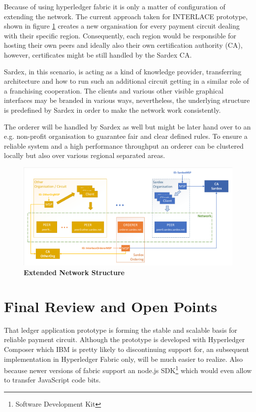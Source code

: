 Because of using hyperledger fabric it is only a matter of configuration of extending the network. The current approach taken for INTERLACE prototype, shown in figure \ref{fig:prototype-net-ext} creates a new organisation for every payment circuit dealing with their specific region. Consequently, each region would be responsible for hosting their own peers and ideally also their own certification authority (CA), however, certificates might be still handled by the Sardex CA. 

Sardex, in this scenario, is acting as a kind of knowledge provider, transferring architecture and how to run such an additional circuit getting in a similar role of a franchising cooperation. The clients and various other visible graphical interfaces may be branded in various ways, nevertheless, the underlying structure is predefined by Sardex in order to make the network work consistently.

The orderer will be handled by Sardex as well but might be later hand over to an e.g. non-profit organisation to guarantee fair and clear defined rules. To ensure a reliable system and a high performance throughput an orderer can be clustered locally but also over various regional separated areas.

\begin{figure}[htbp]
  \centering
  \includegraphics[width=1.0\textwidth, clip, trim=1mm 1mm 1mm 1mm]{Figures/extended-network}
  \caption{\bf\small Extended Network Structure}
  \label{fig:prototype-net-ext}
\end{figure}

\section{Final Review and Open Points}

That ledger application prototype is forming the stable and scalable basis for reliable payment circuit. Although the prototype is developed with Hyperledger Composer which IBM is pretty likely to discontinuing support for, an subsequent implementation in Hyperledger Fabric only, will be much easier to realize. Also because newer versions of fabric support an node.js SDK\footnote{Software Development Kit} which would even allow to transfer JavaScript code bits.

